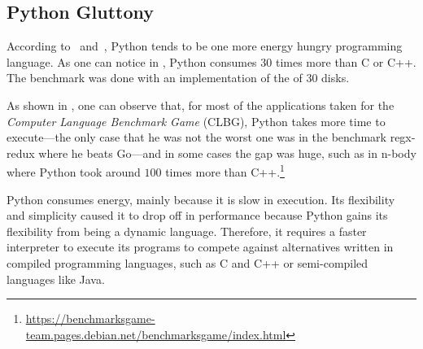 \subsection{Python Gluttony}
According to~\cite{pinto_energy_2017} and~\cite{noureddine_preliminary_2012}, Python tends to be one more energy hungry programming language.
As one can notice in , Python consumes $30$ times more than C or C++.
The benchmark was done with an implementation of the  of 30 disks.

As shown in , one can observe that, for most of the applications taken for the \emph{Computer Language Benchmark Game} (CLBG), Python takes more time to execute---the only case that he was not the worst one was in the benchmark \textsf{regx-redux} where he beats Go---and in some cases the gap was huge, such as in \textsf{n-body} where Python took around $100$ times more than C++.\footnote{\url{https://benchmarksgame-team.pages.debian.net/benchmarksgame/index.html}}

Python consumes energy, mainly because it is slow in execution.
Its flexibility and simplicity caused it to drop off in performance because Python gains its flexibility from being a dynamic language.
Therefore, it requires a faster interpreter to execute its programs to compete against alternatives written in compiled programming languages, such as C and C++ or semi-compiled languages like Java.

